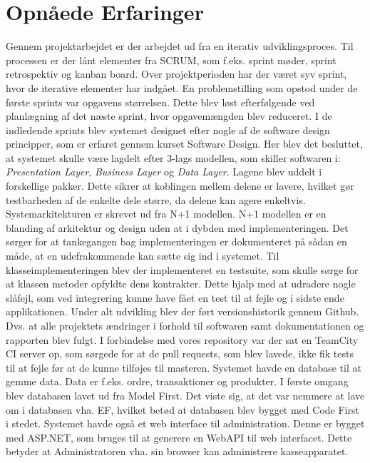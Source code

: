 \section{Opnåede Erfaringer}
Gennem projektarbejdet er der arbejdet ud fra en iterativ udviklingsproces. Til processen er der lånt elementer fra SCRUM, som f.eks. sprint møder, sprint retrospektiv og kanban board. Over projektperioden har der været syv sprint, hvor de iterative elementer har indgået. En problemstilling som opstod under de første sprints var opgavens størrelsen. Dette blev løst efterfølgende ved planlægning af det næste sprint, hvor opgavemængden blev reduceret.
\newline\newline
I de indledende sprints blev systemet designet efter nogle af de software design principper, som er erfaret gennem kurset Software Design. Her blev det besluttet, at systemet skulle være lagdelt efter 3-lags modellen, som skiller softwaren i: \textit{Presentation Layer}, \textit{Business Layer} og \textit{Data Layer}. Lagene blev uddelt i forskellige pakker. Dette sikrer at koblingen mellem delene er lavere, hvilket gør testbarheden af de enkelte dele større, da delene kan agere enkeltvis.
\newline\newline
Systemarkitekturen er skrevet ud fra N+1 modellen. N+1 modellen er en blanding af arkitektur og design uden at i dybden med implementeringen. Det sørger for at tankegangen bag implementeringen er dokumenteret på sådan en måde, at en udefrakommende kan sætte sig ind i systemet.
\newline\newline 
Til klasseimplementeringen blev der implementeret en testsuite, som skulle sørge for at klassen metoder opfyldte dens kontrakter. Dette hjalp med at udradere nogle slåfejl, som ved integrering kunne have fået en test til at fejle og i sidste ende applikationen.
\newline\newline
Under alt udvikling blev der ført versionshistorik gennem Github. Dvs. at alle projektets ændringer i forhold til softwaren samt dokumentationen og rapporten blev fulgt. I forbindelse med vores repository var der sat en TeamCity CI server op, som sørgede for at de pull requests, som blev lavede, ikke fik tests til at fejle før at de kunne tilføjes til masteren.
\newline\newline
Systemet havde en database til at gemme data. Data er f.eks. ordre, transaktioner og produkter. I første omgang blev databasen lavet ud fra Model First. Det viste sig, at det var nemmere at lave om i databasen vha. EF, hvilket betød at databasen blev bygget med Code First i stedet.
\newline\newline
Systemet havde også et web interface til administration. Denne er bygget med ASP.NET, som bruges til at generere en WebAPI til web interfacet. Dette betyder at Administratoren vha. sin browser kan administrere kasseapparatet.
